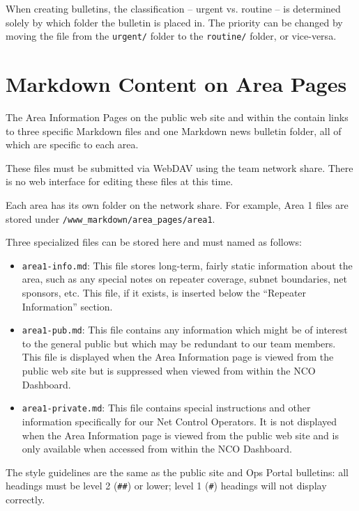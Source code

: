 \documentclass[pdflatex,letterpaper,twoside,12pt]{book}
\begin{document}
When creating bulletins, the classification -- urgent vs. routine -- is determined solely by which folder the bulletin is placed in.  The priority can be changed by moving the file from the \texttt{urgent/} folder to the \texttt{routine/} folder, or vice-versa.


\section{Markdown Content on Area Pages}

The Area Information Pages on the public web site and within the  contain links to three specific Markdown files and one Markdown news bulletin folder, all of which are specific to each area.

These files must be submitted via WebDAV using the team network share.  There is no web interface for editing these files at this time.

Each area has its own folder on the network share.  For example, Area 1 files are stored under \texttt{/www\_markdown/area\_pages/area1}.

Three specialized files can be stored here and must named as follows:

\begin{itemize}
\item \texttt{area1-info.md}: This file stores long-term, fairly static information about the area, such as any special notes on repeater coverage, subnet boundaries, net sponsors, etc.  This file, if it exists, is inserted below the ``Repeater Information'' section.
\item \texttt{area1-pub.md}: This file contains any information which might be of interest to the general public but which may be redundant to our team members.  This file is displayed when the Area Information page is viewed from the public web site but is suppressed when viewed from within the NCO Dashboard.
\item \texttt{area1-private.md}:  This file contains special instructions and other information specifically for our Net Control Operators.  It is not displayed when the Area Information page is viewed from the public web site and is only available when accessed from within the NCO Dashboard.
\end{itemize}

The style guidelines are the same as the public site and Ops Portal bulletins:  all headings must be level 2 (\texttt{\#\#}) or lower;  level 1 (\texttt{\#}) headings will not display correctly.
\end{document}
